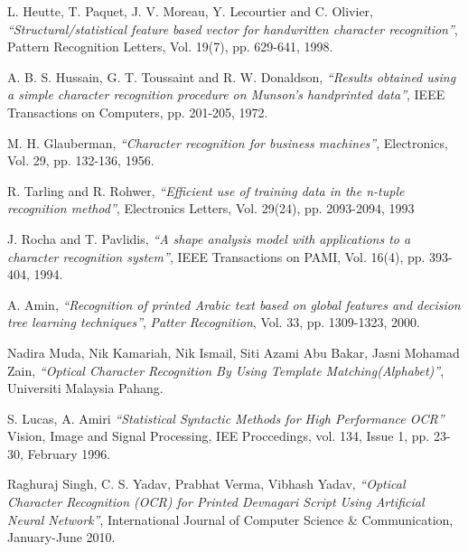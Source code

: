 \begin{thebibliography}{100}
	
		
		L. Heutte, T. Paquet, J. V. Moreau, Y. Lecourtier and C. Olivier,
		\emph{``Structural/statistical feature based vector for handwritten character recognition''},
		Pattern Recognition Letters,
		Vol. 19(7), pp. 629-641,
		1998.
		
		A. B. S. Hussain, G. T. Toussaint and R. W. Donaldson,
		\emph{``Results obtained using a simple character recognition procedure on Munson’s handprinted data''},
		IEEE Transactions on Computers, pp. 201-205,
		1972.
		
		M. H. Glauberman,
		\emph{``Character recognition for business
machines''},
		Electronics,
		Vol. 29, pp. 132-136,
		1956.
		
		R. Tarling and R. Rohwer,
		\emph{``Efficient use of training data in
the n-tuple recognition method''},
		Electronics Letters,
		Vol. 29(24), pp. 2093-2094,
		1993
		
		J. Rocha and T. Pavlidis,
		\emph{``A shape analysis model with applications to a character recognition system''},
		IEEE Transactions on PAMI,
		Vol. 16(4), pp. 393-404, 
		1994.
		
		A. Amin,
		\emph{``Recognition of printed Arabic text based on global features and decision tree learning techniques''},
		\textit{Patter Recognition},
		Vol. 33, pp. 1309-1323,
		2000.
	
		Nadira Muda, Nik Kamariah, Nik Ismail, Siti Azami Abu Bakar, Jasni Mohamad Zain,
		\emph{``Optical Character Recognition By Using Template Matching(Alphabet)''},
		Universiti Malaysia Pahang.
		
		S. Lucas, A. Amiri
		\emph{``Statistical Syntactic Methods for High Performance OCR''}
		Vision, Image and Signal Processing, IEE Proccedings,
		vol. 134, Issue 1, pp. 23-30,
		February 1996.
		
		Raghuraj Singh, C. S. Yadav, Prabhat Verma, Vibhash Yadav,
		\emph{``Optical Character Recognition (OCR) for Printed Devnagari Script Using Artificial Neural Network''},
		International Journal of Computer Science \& Communication,
		January-June  2010.
	

\end{thebibliography}

